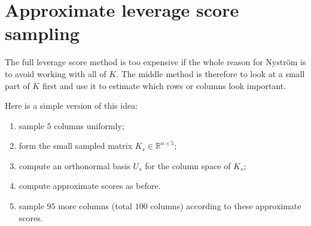 \chapter{Approximate leverage score sampling}

The full leverage score method is too expensive if the whole reason for Nystr\"om is to avoid working with all of $K$. The middle method is therefore to look at a small part of $K$ first and use it to estimate which rows or columns look important.

Here is a simple version of this idea:
\begin{enumerate}
\item sample $5$ columns uniformly;
\item form the small sampled matrix $K_s\in\mathbb{R}^{n\times 5}$;
\item compute an orthonormal basis $U_s$ for the column space of $K_s$;
\item compute approximate scores as before.
\item sample $95$ more columns (total $100$ columns) according to these approximate scores.
\end{enumerate}
